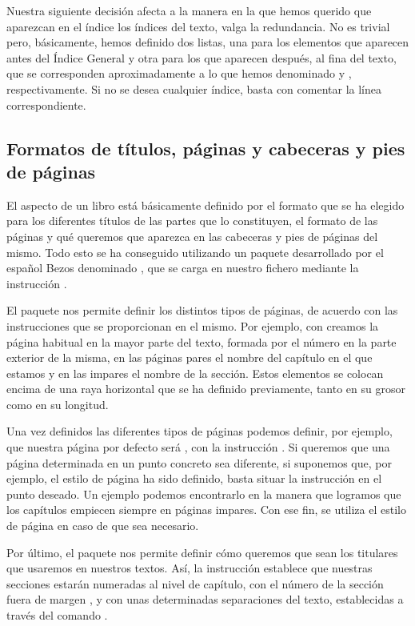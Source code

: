 Nuestra siguiente decisión afecta a la manera en la que hemos querido que aparezcan en el índice los índices del texto, valga la redundancia. No es trivial pero, básicamente, hemos definido dos listas, una para los elementos que aparecen antes del Índice General y otra para los  que aparecen después, al fina del texto, que se corresponden aproximadamente a lo que hemos denominado  y , respectivamente. Si no se desea cualquier índice, basta con comentar la línea correspondiente.

\subsection{Formatos de títulos, páginas y cabeceras y pies de páginas}
El aspecto de un libro está básicamente definido por el formato que se ha elegido para los diferentes títulos de las partes que lo constituyen, el formato de las páginas y qué queremos que aparezca en las cabeceras y pies de páginas del mismo. Todo esto se ha conseguido utilizando un paquete desarrollado por el español Bezos denominado , que se carga en nuestro fichero mediante la instrucción .

El paquete nos permite definir los distintos tipos de páginas, de acuerdo con las instrucciones que se proporcionan en el mismo. Por ejemplo, con  creamos la página habitual en la mayor parte del texto, formada por el número en la parte exterior de la misma, en las páginas pares el nombre del capítulo en el que estamos y en las impares el nombre de la sección. Estos elementos se colocan encima de una raya horizontal que se ha definido previamente, tanto en su grosor como en su longitud.

Una vez definidos las diferentes tipos de páginas podemos definir, por ejemplo, que nuestra página por defecto será , con la instrucción . Si queremos que una página determinada en un punto concreto sea diferente, si suponemos que, por ejemplo, el estilo de página  ha sido definido, basta situar la instrucción  en el punto deseado. Un ejemplo podemos encontrarlo en la manera que logramos que los capítulos empiecen siempre en páginas impares. Con ese fin, se utiliza el estilo de página  en caso de que sea necesario.

Por último,  el paquete  nos permite definir cómo queremos que sean los titulares que usaremos en nuestros textos. Así,  la instrucción  establece que nuestras secciones estarán numeradas al nivel de capítulo, con el número de la sección fuera de margen , y con unas determinadas separaciones del texto, establecidas a través del comando . 

